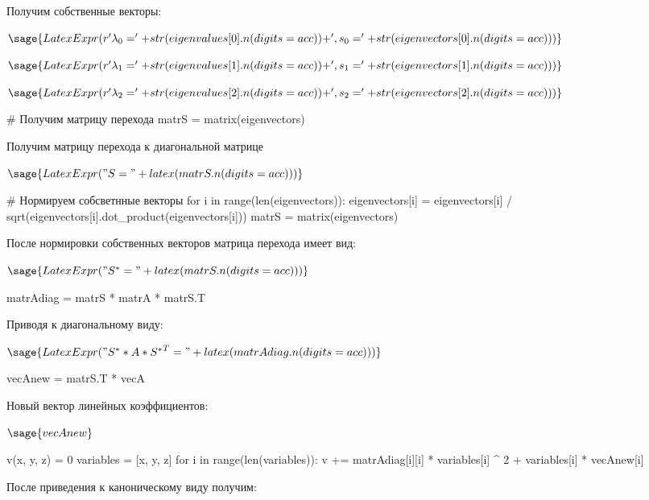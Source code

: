 \documentclass[14pt, a4paper]{article}
\begin{document}
Получим собственные векторы:

$\sage{LatexExpr(r'\lambda_0 = ' + str(eigenvalues[0].n(digits = acc)) + ', s_0 = ' + str(eigenvectors[0].n(digits = acc)))}$

$\sage{LatexExpr(r'\lambda_1 = ' + str(eigenvalues[1].n(digits = acc)) + ', s_1 = ' + str(eigenvectors[1].n(digits = acc)))}$

$\sage{LatexExpr(r'\lambda_2 = ' + str(eigenvalues[2].n(digits = acc)) + ', s_2 = ' + str(eigenvectors[2].n(digits = acc)))}$

\begin{sagesilent}
    # Получим матрицу перехода
    matrS = matrix(eigenvectors)
\end{sagesilent}

Получим матрицу перехода к диагональной матрице

$\sage{LatexExpr("S = " + latex(matrS.n(digits = acc)))}$

\begin{sagesilent}
    # Нормируем собсветнные векторы
    for i in range(len(eigenvectors)):
        eigenvectors[i] = eigenvectors[i] / sqrt(eigenvectors[i].dot_product(eigenvectors[i]))
    matrS = matrix(eigenvectors)
\end{sagesilent}

После нормировки собственных векторов матрица перехода имеет вид:

$\sage{LatexExpr("S^* = " + latex(matrS.n(digits = acc)))}$

\begin{sagesilent}
    matrAdiag = matrS * matrA * matrS.T
\end{sagesilent}

Приводя к диагональному виду:

$\sage{LatexExpr("S^{*} * A * {S^{*}}^T = " + latex(matrAdiag.n(digits = acc)))}$

\begin{sagesilent}
    vecAnew = matrS.T * vecA
\end{sagesilent}

Новый вектор линейных коэффициентов:

$\sage{vecAnew}$

\begin{sagesilent}
    v(x, y, z) = 0
    variables = [x, y, z]
    for i in range(len(variables)):
        v += matrAdiag[i][i] * variables[i] ^ 2 + variables[i] * vecAnew[i]
\end{sagesilent}

После приведения к каноническому виду получим:
\end{document}

